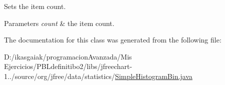 Sets the item count.


\begin{DoxyParams}{Parameters}
{\em count} & the item count. \\
\hline
\end{DoxyParams}


The documentation for this class was generated from the following file\+:\begin{DoxyCompactItemize}
\item 
D\+:/ikasgaiak/programacion\+Avanzada/\+Mis Ejercicios/\+P\+B\+Ldefinitibo2/libs/jfreechart-\/1../source/org/jfree/data/statistics/\mbox{\hyperlink{_simple_histogram_bin_8java}{Simple\+Histogram\+Bin.\+java}}\end{DoxyCompactItemize}
